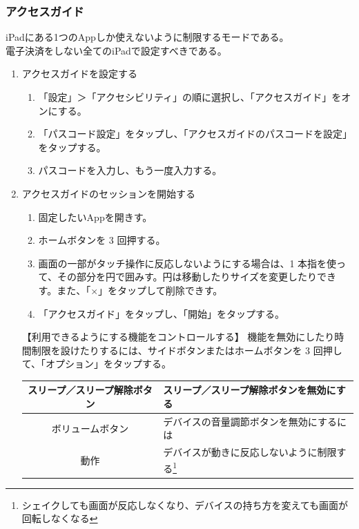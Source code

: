 \documentclass[a4paper]{ltjsreport}
\begin{document}
\subsubsection{アクセスガイド}
iPadにある1つのAppしか使えないように制限するモードである。\\
電子決済をしない全てのiPadで設定すべきである。
\begin{enumerate}
  \item アクセスガイドを設定する
        \begin{enumerate}[手順1.]
          \item 「設定」＞「アクセシビリティ」の順に選択し、「アクセスガイド」をオンにする。
          \item 「パスコード設定」をタップし、「アクセスガイドのパスコードを設定」をタップする。
          \item パスコードを入力し、もう一度入力する。
        \end{enumerate}
  \item アクセスガイドのセッションを開始する
        \begin{enumerate}[手順1.]
          \item 固定したいAppを開きす。
          \item ホームボタンを 3 回押する。
          \item 画面の一部がタッチ操作に反応しないようにする場合は、1 本指を使って、その部分を円で囲みす。円は移動したりサイズを変更したりできす。また、「$\times$」をタップして削除できす。
          \item 「アクセスガイド」をタップし、「開始」をタップする。
        \end{enumerate}
        \begin{itembox}[l]{【利用できるようにする機能をコントロールする】}
          機能を無効にしたり時間制限を設けたりするには、サイドボタンまたはホームボタンを 3 回押して、「オプション」をタップする。
          \begin{center}
            \begin{tabular}{|c|l|}\hline
              スリープ／スリープ解除ボタン & スリープ／スリープ解除ボタンを無効にする                                                     \\ \hline
              ボリュームボタン       & デバイスの音量調節ボタンを無効にするには                                                     \\ \hline
              動作             & デバイスが動きに反応しないように制限する\footnote{シェイクしても画面が反応しなくなり、デバイスの持ち方を変えても画面が回転しなくなる} \\ \hline

\end{tabular}
\end{center}
\end{itembox}
\end{enumerate}
\end{document}
